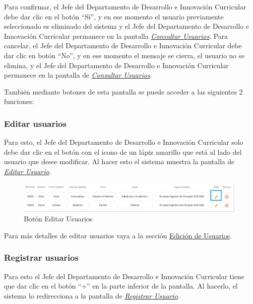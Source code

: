 \begin{enumerate}
\begin{figure}[H]
	\end{figure}
	
	Para confirmar, el Jefe del Departamento de Desarrollo e Innovación Curricular debe dar clic en el botón “Sí”, y en ese momento el usuario previamente seleccionado es eliminado del sistema y el Jefe del Departamento de Desarrollo e Innovación Curricular permanece en la pantalla \hyperlink{consultarUs-JDDIC}{\textit{Consultar Usuarios}}.
	Para cancelar, el Jefe del Departamento de Desarrollo e Innovación Curricular debe dar clic en botón “No”, y en ese momento el mensaje se cierra, el usuario no se elimina, y el Jefe del Departamento de Desarrollo e Innovación Curricular permanece en la pantalla de \hyperlink{consultarUs-JDDIC}{\textit{Consultar Usuarios}}.
	
\end{enumerate}

También mediante botones de esta pantalla se puede acceder a las siguientes 2 funciones:

\subsubsection{Editar usuarios}

Para esto, el Jefe del Departamento de Desarrollo e Innovación Curricular solo debe dar clic en el botón con el icono de un lápiz amarillo que está al lado del usuario que desee modificar. Al hacer esto el sistema muestra la pantalla  de \hyperlink{editarUs-JDDIC}{\textit{Editar Usuario}}.

\begin{figure}[H]
	\centering
	\hypertarget{editar-JDDIC}{\includegraphics[width=0.7\linewidth]{images/SP5/BtnEditar}}
	\caption{Botón Editar Usuarios}
	\label{editar-JDDIC}
\end{figure}

Para más detalles de editar usuarios vaya a la sección \hyperlink{editar-user-JDDIC}{Edición de Usuarios}.

\subsubsection{Registrar  usuarios}

Para esto el Jefe del Departamento de Desarrollo e Innovación Curricular tiene que dar clic en el botón “+” en la parte inferior de la pantalla. Al hacerlo, el sistema  lo redirecciona a la pantalla de \hyperlink{registrarUs-JDDIC}{\textit{Registrar Usuario}}.

